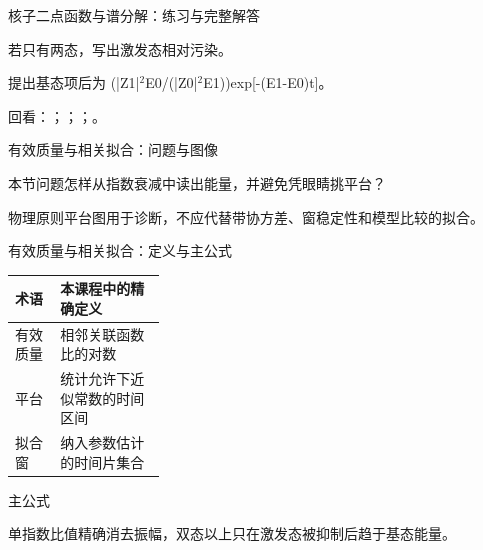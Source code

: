 \begin{frame}[t]{核子二点函数与谱分解：练习与完整解答}
\footnotesize
\begin{block}{}若只有两态，写出激发态相对污染。\end{block}
\begin{exampleblock}{}提出基态项后为 (|Z1|\ensuremath{^{2}}E0/\allowbreak{}(|Z0|\ensuremath{^{2}}E1))exp[-(E1-E0)t]。\end{exampleblock}
\vfill
\scriptsize 回看：；；；。
\end{frame}

\begin{frame}[t]{有效质量与相关拟合：问题与图像}
\footnotesize
\begin{block}{本节问题}怎样从指数衰减中读出能量，并避免凭眼睛挑平台？\end{block}
\begin{block}{物理原则}\quad 平台图用于诊断，不应代替带协方差、窗稳定性和模型比较的拟合。\end{block}
\end{frame}

\begin{frame}[t]{有效质量与相关拟合：定义与主公式}
\footnotesize\begin{tabularx}{\linewidth}{p{0.30\linewidth}Y}
\toprule 术语 & 本课程中的精确定义\\\midrule
{} 有效质量 & 相邻关联函数比的对数\\
 平台 & 统计允许下近似常数的时间区间\\
 拟合窗 & 纳入参数估计的时间片集合\\
\bottomrule\end{tabularx}\vspace{0.15cm}
\begin{block}{ 主公式}\centering{}\end{block}
单指数比值精确消去振幅，双态以上只在激发态被抑制后趋于基态能量。
\end{frame}

